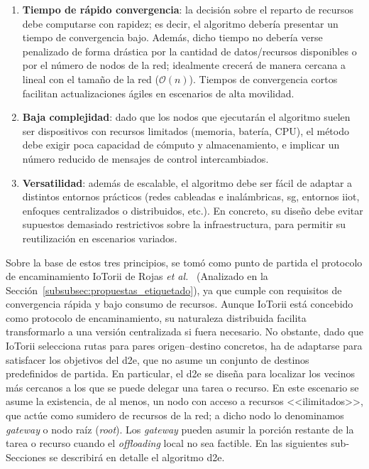 \begin{enumerate}

    \item \textbf{Tiempo de rápido convergencia}: la decisión sobre el reparto de recursos debe computarse con rapidez; es decir, el algoritmo debería presentar un tiempo de convergencia bajo. Además, dicho tiempo no debería verse penalizado de forma drástica por la cantidad de datos/recursos disponibles o por el número de nodos de la red; idealmente crecerá de manera cercana a lineal con el tamaño de la red ($\mathcal{O}(n)$). Tiempos de convergencia cortos facilitan actualizaciones ágiles en escenarios de alta movilidad.
    
    \item \textbf{Baja complejidad}: dado que los nodos que ejecutarán el algoritmo suelen ser dispositivos con recursos limitados (memoria, batería, CPU), el método debe exigir poca capacidad de cómputo y almacenamiento, e implicar un número reducido de mensajes de control intercambiados.
    
    \item \textbf{Versatilidad}: además de escalable, el algoritmo debe ser fácil de adaptar a distintos entornos prácticos (redes cableadas e inalámbricas, \gls{sg}, entornos \gls{iiot}, enfoques centralizados o distribuidos, etc.). En concreto, su diseño debe evitar supuestos demasiado restrictivos sobre la infraestructura, para permitir su reutilización en escenarios variados.
\end{enumerate}

Sobre la base de estos tres principios, se tomó como punto de partida el protocolo de encaminamiento IoTorii de Rojas \textit{et al.}~\cite{rojas2021outperforming} (Analizado en la Sección~\ref{subsubsec:propuestas_etiquetado}), ya que cumple con requisitos de convergencia rápida y bajo consumo de recursos. Aunque IoTorii está concebido como protocolo de encaminamiento, su naturaleza distribuida facilita transformarlo a una versión centralizada si fuera necesario. No obstante, dado que IoTorii selecciona rutas para pares origen–destino concretos, ha de adaptarse para satisfacer los objetivos del \gls{d2e}, que no asume un conjunto de destinos predefinidos de partida. En particular, el \gls{d2e} se diseña para localizar los vecinos más cercanos a los que se puede delegar una tarea o recurso. En este escenario se asume la existencia, de al menos, un nodo con acceso a recursos <<ilimitados>>, que actúe como sumidero de recursos de la red; a dicho nodo lo denominamos \textit{gateway} o nodo raíz (\textit{root}). Los \textit{gateway} pueden asumir la porción restante de la tarea o recurso cuando el \textit{offloading} local no sea factible. En las siguientes sub-Secciones se describirá en detalle el algoritmo \gls{d2e}.

